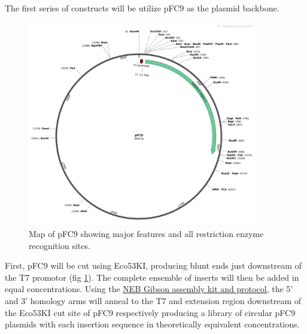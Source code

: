 \documentclass[11pt]{article}
\begin{document}
The first series of constructs will be utilize pFC9 as the plasmid backbone.   

\begin{figure}[H]
	\includegraphics[width=10cm]{images/plasmid_maps/pFC9_Map.png}
	\centering
	\caption{Map of pFC9 showing major features and all restriction enzyme recognition sites.}
	\label{fig:pFC9}
\end{figure}

First, pFC9 will be cut using Eco53KI, producing blunt ends just downstream of the T7 promotor (fig \ref{fig:pFC9}). The complete ensemble of inserts will then be added in equal concentrations. Using the \href{https://www.neb.com/protocols/2012/12/11/gibson-assembly-protocol-e5510}{NEB Gibson assembly kit and protocol}, the 5' and 3' homology arms will anneal to the T7 and extension region downstream of the Eco53KI cut site of pFC9 respectively producing a library of circular pFC9 plasmids with each insertion sequence in theoretically equivalent concentrations. 
\end{document}
